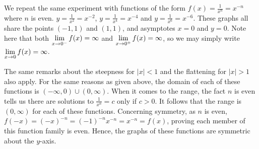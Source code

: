\documentclass{ximera}
\begin{document}
We repeat the same experiment with functions of the form $f(x) = \frac{1}{x^{n}} = x^{-n}$ where $n$ is even. $y = \frac{1}{x^2} = x^{-2}$, $y = \frac{1}{x^4} = x^{-4}$ and $y = \frac{1}{x^6} = x^{-6}$.  These graphs all share the points $(-1,1)$ and $(1,1)$, and asymptotes $x = 0$ and $y = 0$.  Note here that both $\ds{\lim_{x \rightarrow 0^{-}} f(x) = \infty}$ and $\ds{\lim_{x \rightarrow 0^{+}} f(x) = \infty}$, so we may simply write $\ds{\lim_{x \rightarrow 0} f(x) = \infty}$. 

The same remarks about the steepness for $|x|<1$ and the flattening for $|x|>1$ also apply. For the same reasons as given above, the domain of each of these functions is $(-\infty, 0) \cup (0, \infty)$.  When it comes to the range, the fact $n$ is even tells us there are  solutions to $\frac{1}{x^n} = c$ only if $c>0$. It follows that the range is $(0, \infty)$ for each of these functions.  Concerning symmetry, as $n$ is even, $f(-x) = (-x)^{-n} = (-1)^{-n} x^{-n} = x^{-n} = f(x)$, proving each member of this function family is even.  Hence,  the graphs of these functions are symmetric about the $y$-axis.
\end{document}
